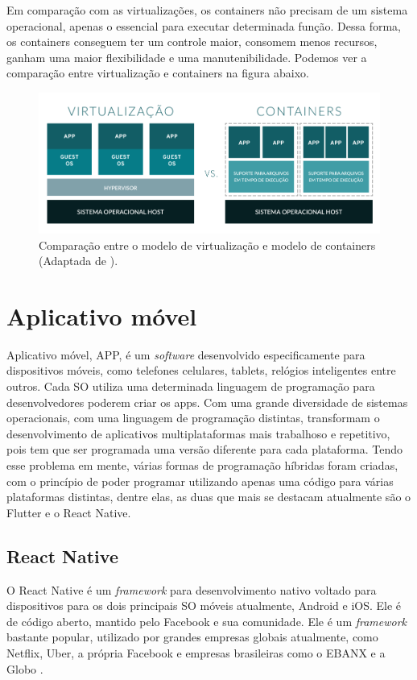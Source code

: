Em comparação com as virtualizações, os containers não precisam de um sistema operacional, apenas o essencial para executar determinada função. Dessa forma, os containers conseguem ter um controle maior, consomem menos recursos, ganham uma maior flexibilidade e uma manutenibilidade. Podemos ver a comparação entre virtualização e containers na figura abaixo.

\begin{figure}[H]
  \centering
  \includegraphics[width=.80\textwidth]{assets/virtualization-vs-containers.png} 
  \caption{Comparação entre o modelo de virtualização e modelo de containers (Adaptada de \cite{redhat2020Containers}).}
  \label{fig:virtualization-vs-containers}
\end{figure}


\section{Aplicativo móvel}
\label{fund:app}
Aplicativo móvel, APP, é um \textit{software} desenvolvido especificamente para dispositivos móveis, como telefones celulares, tablets, relógios inteligentes entre outros. Cada SO utiliza uma determinada linguagem de programação para desenvolvedores poderem criar os apps. Com uma grande diversidade de sistemas operacionais, com uma linguagem de programação distintas, transformam o desenvolvimento de aplicativos multiplataformas mais trabalhoso e repetitivo, pois tem que ser programada uma versão diferente para cada plataforma. Tendo esse problema em mente, várias formas de programação híbridas foram criadas, com o princípio de poder programar utilizando apenas uma código para várias plataformas distintas, dentre elas, as duas que mais se destacam atualmente são o Flutter e o React Native.

\subsection{React Native}
\label{fund:react-native}
O React Native é um \textit{framework} para desenvolvimento nativo voltado para dispositivos para os dois principais SO móveis atualmente, Android e iOS. Ele é de código aberto, mantido pelo Facebook e sua comunidade.  Ele é um \textit{framework} bastante popular, utilizado por grandes empresas globais atualmente, como Netflix, Uber, a própria Facebook e empresas brasileiras como o EBANX e a Globo \cite{empresasbrreact}.

